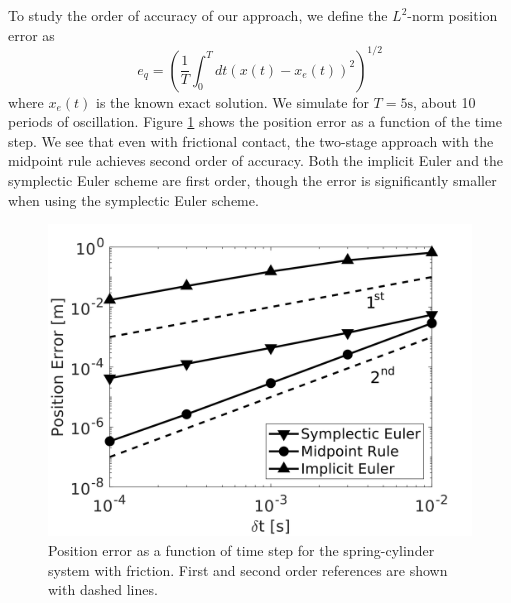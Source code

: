 To study the order of accuracy of our approach, we define the $L^2$-norm
position error as
\begin{equation*}
    e_q = \left(\frac{1}{T}\int_0^T dt(x(t)-x_e(t))^2\right)^{1/2}
\end{equation*}
where $x_e(t)$ is the known exact solution. We simulate for $T=5\text{s}$, about
10 periods of oscillation. Figure \ref{fig:spring_cylinder_position_error} shows
the position error as a function of the time step. We see that even with
frictional contact, the two-stage approach with the midpoint rule achieves
second order of accuracy. Both the implicit Euler and the symplectic Euler
scheme are first order, though the error is significantly smaller when using
the symplectic Euler scheme.
\begin{figure}[!h]
	\centering
	\includegraphics[width=0.7\columnwidth]{figures/spring_cylinder/position_error.png}
	\caption{\label{fig:spring_cylinder_position_error} 
	Position error as a function of time step for the spring-cylinder system
	with friction. First and second order references are shown with dashed
	lines.}
\end{figure}
